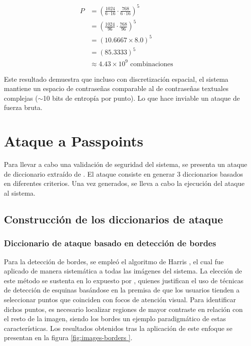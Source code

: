 \begin{align*}
	P &= \left( \frac{1024}{6 \cdot 16} \cdot \frac{768}{6 \cdot 16} \right)^5 \\
	&= \left( \frac{1024}{96} \cdot \frac{768}{96} \right)^5 \\
	&= (10.6667 \times 8.0)^5 \\
	&= (85.3333)^5 \\
	&\approx 4.43 \times 10^9 \text{ combinaciones}
\end{align*}

Este resultado demuestra que incluso con discretización espacial, el sistema mantiene un espacio de contraseñas comparable al de contraseñas textuales complejas ($\sim$10 bits de entropía por punto). Lo que hace inviable un ataque de fuerza bruta.


\section{Ataque a Passpoints}
Para llevar a cabo una validaci\'on de seguridad del sistema, se presenta un ataque de diccionario extra\'ido de \cite{van2010purely}. El ataque consiste en generar 3 diccionarios basados en diferentes criterios. Una vez generados, se lleva a cabo la ejecuci\'on del ataque al sistema.
\subsection{Construcci\'on de los diccionarios de ataque}
\subsubsection{Diccionario de ataque basado en detecci\'on de bordes}
Para la detección de bordes, se empleó el algoritmo de Harris \cite{Harris1988ACC}, el cual fue aplicado de manera sistemática a todas las imágenes del sistema. La elección de este método se sustenta en lo expuesto por \cite{van2010purely}, quienes justifican el uso de técnicas de detección de esquinas basándose en la premisa de que los usuarios tienden a seleccionar puntos que coinciden con focos de atención visual. Para identificar dichos puntos, es necesario localizar regiones de mayor contraste en relación con el resto de la imagen, siendo los bordes un ejemplo paradigmático de estas características. Los resultados obtenidos tras la aplicación de este enfoque se presentan en la figura \ref{fig:images-borders }.

